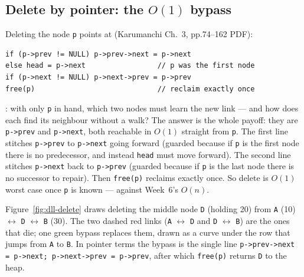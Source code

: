 \documentclass[11pt]{article}
\begin{document}
\subsection{Delete by pointer: the $O(1)$ bypass}

Deleting the node \texttt{p} points at (Karumanchi Ch.~3, pp.74--162 PDF):

{\footnotesize
\begin{verbatim}
if (p->prev != NULL) p->prev->next = p->next
else head = p->next                 // p was the first node
if (p->next != NULL) p->next->prev = p->prev
free(p)                             // reclaim exactly once
\end{verbatim}
}

: with only \texttt{p} in hand, which two nodes must learn the new link --- and how does each find its neighbour without a walk? The answer is the whole payoff: they are \texttt{p->prev} and \texttt{p->next}, both reachable in $O(1)$ straight from \texttt{p}. The first line stitches \texttt{p->prev} to \texttt{p->next} going forward (guarded because if \texttt{p} is the first node there is no predecessor, and instead \texttt{head} must move forward). The second line stitches \texttt{p->next} back to \texttt{p->prev} (guarded because if \texttt{p} is the last node there is no successor to repair). Then \texttt{free(p)} reclaims exactly once. So delete is $O(1)$ worst case once \texttt{p} is known --- against Week~6's $O(n)$.

Figure~\ref{fig:dll-delete} draws deleting the middle node \texttt{D} (holding 20) from \texttt{A} (10) $\leftrightarrow$ \texttt{D} $\leftrightarrow$ \texttt{B} (30). The two dashed red links (\texttt{A} $\leftrightarrow$ \texttt{D} and \texttt{D} $\leftrightarrow$ \texttt{B}) are the ones that die; one green bypass replaces them, drawn as a curve under the row that jumps from \texttt{A} to \texttt{B}. In pointer terms the bypass is the single line \texttt{p->prev->next = p->next; p->next->prev = p->prev}, after which \texttt{free(p)} returns \texttt{D} to the heap.
\end{document}
